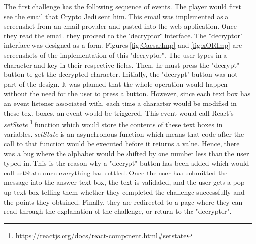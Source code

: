 \documentclass{l4proj}
\begin{document}
The first challenge has the following sequence of events. 
The player would first see the email that Crypto Jedi sent him. 
This email was implemented as a screenshot from an email provider and pasted into the web application.
Once they read the email, they proceed to the "decryptor" interface. 
The "decryptor" interface was designed as a form. 
Figures \ref{fig:CaesarImp} and \ref{fig:xORImp} are screenshots of the implementation of this "decryptor".
The user types in a character and key in their respective fields. 
Then, he must press the "decrypt" button to get the decrypted character.
Initially, the "decrypt" button was not part of the design. 
It was planned that the whole operation would happen without the need for the user to press a button.
However, since each text box has an event listener associated with, 
each time a character would be modified in these text boxes, an event would be triggered. 
This event would call React's \textit{setState} \footnote{https://reactjs.org/docs/react-component.html\#setstate} function 
which would store the contents of these text boxes in variables.
\textit{setState} is an asynchronous function which means that code after the call to that function would be executed 
before it returns a value. Hence, there was a bug where the alphabet would be shifted by one number less than the user typed in.
This is the reason why a "decrypt" button has been added which would call setState once everything has settled. 
Once the user has submitted the message into the answer text box, the text is validated, 
and the user gets a pop up text box telling them whether they completed the challenge successfully and the points they obtained.
Finally, they are redirected to a page where they can read through the explanation of the challenge, or return to the "decryptor".
\end{document}
